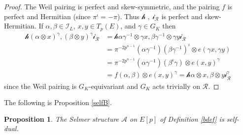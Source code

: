 \documentclass[reqno]{amsart}
\newtheorem{prop}[thm]{Proposition}
\theoremstyle{definition}
\def\A{\mathcal{A}}
\def\cR{\mathcal{R}}
\def\I{\mathcal{I}}
\def\ld{\mathcal{h}}
\def\rd{\mathcal{i}}
\def\pair#1#2{\ld#1,#2\rd}
\begin{document}
\begin{proof}
The Weil pairing is perfect and skew-symmetric, and   
the pairing $f$ is perfect and Hermitian (since $\pi^\iota = -\pi$).  
Thus $\pair{\;}{\;}_\cR$ is perfect and skew-Hermitian.
If $\alpha,\beta \in \I_L$, $x,y \in T_p(E)$, and $\gamma \in G_K$ then
\begin{align*}
\pair{(\alpha \otimes x)^\gamma}{(\beta \otimes y)^\gamma}_\cR 
    &= \pair{\alpha \gamma^{-1} \otimes \gamma x}{\beta \gamma^{-1} \otimes \gamma y}_\cR \\
    &= \pi^{-2p^{n-1}} (\alpha \gamma^{-1})(\beta \gamma^{-1})^\iota 
        \otimes e(\gamma x, \gamma y) \\
    &= \pi^{-2p^{n-1}} (\alpha \gamma^{-1})(\beta^\iota \gamma) \otimes e(x,y)^\gamma \\
    &= f(\alpha,\beta) \otimes e(x,y)^\gamma 
    = \pair{\alpha \otimes x}{\beta \otimes y}_\cR^\gamma
\end{align*}
since the Weil pairing is $G_K$-equivariant and $G_K$ acts trivially on $\cR$.  
\end{proof}

The following is Proposition \ref{selfB}.

\begin{prop}
\label{sd}
The Selmer structure $\A$ on $E[p]$ of Definition \ref{bdef} is 
self-dual.
\end{prop}
\end{document}
